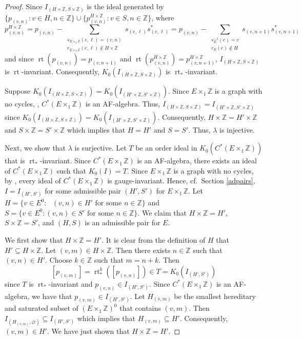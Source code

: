 \documentclass[12pt]{amsbook}%
\newcommand{\lt}{\operatorname{rt}}
\theoremstyle{defin}
\theoremstyle{remark}
\numberwithin{equation}{chapter}
\numberwithin{theor}{section}
\newcommand{\ZZ}{\mathbb{Z}}
\renewcommand{\emptyset}{\varnothing}
\begin{document}
\begin{proof}
Since $I_{ ( H \times \ZZ , S \times \ZZ )  }$ is the ideal generated by $\{ p_{ ( v, n) } :  v \in H , n \in \ZZ \} \cup \{ p_{ ( v, n ) }^{ H \times \ZZ } : v \in S , n \in \ZZ \}$, where 
\[
p_{ (v, n) }^{ H \times \ZZ } = p_{(v, n)} - \sum_{ \substack{  s_{E\times_1 \ZZ}( e, \ell ) =( v, n) \\  r_{E \times_1 \ZZ}( e, \ell ) \notin H \times \ZZ } } s_{ ( e, \ell ) } s_{ ( e, \ell ) }^* =  p_{(v, n)}  - \sum_{ \substack{ s_E^{-1}(e)=    v  \\ r_E(e) \notin H } } s_{ (e, n+1)} s_{(e, n+1)}^*
\]
and since $\lt ( p_{ ( v, n) } ) = p_{ (v, n+1)}$ and $\lt ( p_{ (v, n)}^{ H \times \ZZ } ) = p_{ (v, n+1) }^{ H \times \ZZ }$, $I_{ ( H \times \ZZ , S \times \ZZ ) }$ is $\lt$-invariant.  Consequently, $K_0 ( I_{ ( H \times \ZZ , S \times \ZZ ) } )$ is $\lt_*$-invariant.

Suppose $K_0 ( I_{ (H \times \ZZ , S \times \ZZ )} ) = K_0 ( I_{ (H' \times \ZZ , S' \times \ZZ ) } )$.  Since $E \times_1 \ZZ$ is a graph with no cycles, \cite[Corollary~2.13]{ddmt:cag}, $C^*(E \times_1 \ZZ )$ is an AF-algebra.  Thus, $I_{( H \times \ZZ , S \times \ZZ ) } = I_{ ( H' \times \ZZ , S' \times \ZZ ) }$ since $K_0 ( I_{ (H \times \ZZ , S \times \ZZ )} ) = K_0 ( I_{ (H' \times \ZZ , S' \times \ZZ ) } )$.  Consequently, $H \times \ZZ = H' \times \ZZ$ and $S \times \ZZ = S' \times \ZZ$ which implies that $H = H'$ and $S = S'$.  Thus, $\lambda$ is injective.


Next, we show that $\lambda$ is surjective.  Let $T$ be an order ideal in $K_0 ( C^*( E \times_1 \ZZ ))$ that is $\lt_*$-invariant.  Since $C^*(E\times_1\ZZ)$ is an AF-algebra, there exists an ideal of $C^*(E \times_1\ZZ)$ such that $K_0(I)=T$.  Since $E \times_1\ZZ$ is a graph with no cycles, by \cite[Corollary~3.8]{bhrs:iccig}, every ideal of $C^*(E\times_1\ZZ)$ is gauge-invariant.  Hence, cf.~Section \ref{adpairs}, $I= I_{ ( H' , S' ) }$ for some admissible pair $(H', S')$ for $E \times_1 \ZZ$.  Let $H = \{ v \in E^0 :  \text{ $(v, n) \in H'$ for some $n \in \ZZ$} \}$ and $S = \{ v \in E^0 : \text{$(v, n) \in S'$ for some $n \in \ZZ$} \}$.  We claim that $H \times \ZZ = H'$, $S \times \ZZ = S'$, and $( H, S)$ is an admissible pair for $E$.


We first show that $H \times \ZZ = H'$.  It is clear from the definition of $H$ that $H' \subseteq H \times \ZZ$.  Let $(v, m) \in H \times \ZZ$.  Then there exists $n \in \ZZ$ such that $(v, n) \in H'$.  Choose $k \in \ZZ$ such that $m = n + k$.  Then 
\[
[ p_{ (v, m) } ] = \lt_*^k ( [ p_{(v, n) } ] ) \in T = K_0 ( I_{ (H',S')} ) 
\]
since $T$ is $\lt_*$-invariant and $p_{(v, n) } \in I_{ (H', S') }$.  Since $C^*( E \times_1 \ZZ )$ is an AF-algebra, we have that $p_{(v, m) } \in I_{ (H', S') }$.  Let $H_{(v, m)}$ be the smallest hereditary and saturated subset of $(E\times_1 \ZZ)^0$ that contains $(v, m)$.  Then $I_{ ( H_{ (v,m)} , \emptyset ) } \subseteq I_{ (H', S') }$ which implies that $H_{ (v, m)} \subseteq H'$.  Consequently, $(v,m) \in H'$.  We have just shown that $H \times \ZZ = H'$.


\end{proof}
\end{document}
